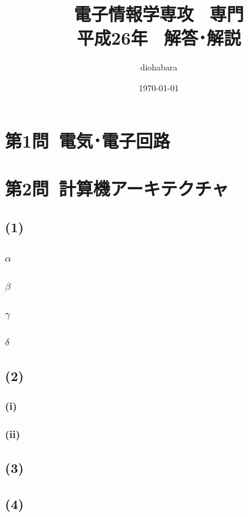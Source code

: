 \documentclass[a4paper,12pt,xelatex,ja=standard]{bxjsarticle}
\title{電子情報学専攻 \, 専門 \\ 平成26年 \, 解答･解説}
\author{diohabara}
\date{\today}
\begin{document}
\maketitle

\section*{第1問\ 電気･電子回路}

\section*{第2問\ 計算機アーキテクチャ}
\subsection*{(1)}
\subsubsection*{$\alpha$}

\subsubsection*{$\beta$}

\subsubsection*{$\gamma$}

\subsubsection*{$\delta$}

\subsection*{(2)}
\subsubsection*{(i)}
\subsubsection*{(ii)}

\subsection*{(3)}

\subsection*{(4)}
\end{document}
